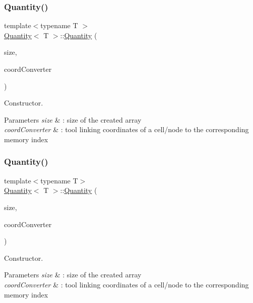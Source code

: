 \subsubsection{\texorpdfstring{Quantity()}{Quantity()}\hspace{0.1cm}{\footnotesize\ttfamily [1/2]}}
{\footnotesize\ttfamily template$<$typename T $>$ \\
\hyperlink{classQuantity}{Quantity}$<$ T $>$\+::\hyperlink{classQuantity}{Quantity} (\begin{DoxyParamCaption}\item[{unsigned int}]{size,  }\item[{const \hyperlink{classCoordConverter}{Coord\+Converter} \&}]{coord\+Converter }\end{DoxyParamCaption})}



Constructor. 


\begin{DoxyParams}{Parameters}
{\em size} & \+: size of the created array \\
\hline
{\em coord\+Converter} & \+: tool linking coordinates of a cell/node to the corresponding memory index \\
\hline
\end{DoxyParams}
\mbox{\label{classQuantity_ab07b278cfe453e82756684b1730efc95}} 
\subsubsection{\texorpdfstring{Quantity()}{Quantity()}\hspace{0.1cm}{\footnotesize\ttfamily [2/2]}}
{\footnotesize\ttfamily template$<$typename T$>$ \\
\hyperlink{classQuantity}{Quantity}$<$ T $>$\+::\hyperlink{classQuantity}{Quantity} (\begin{DoxyParamCaption}\item[{unsigned int}]{size,  }\item[{const \hyperlink{classCoordConverter}{Coord\+Converter} \&}]{coord\+Converter }\end{DoxyParamCaption})}



Constructor. 


\begin{DoxyParams}{Parameters}
{\em size} & \+: size of the created array \\
\hline
{\em coord\+Converter} & \+: tool linking coordinates of a cell/node to the corresponding memory index \\
\hline
\end{DoxyParams}



